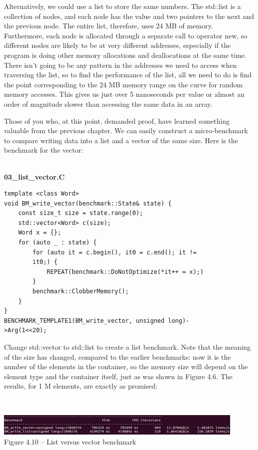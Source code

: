 Alternatively, we could use a list to store the same numbers. The std::list is a collection of nodes, and each node has the value and two pointers to the next and the previous node. The entire list, therefore, uses 24 MB of memory. Furthermore, each node is allocated through a separate call to operator new, so different nodes are likely to be at very different addresses, especially if the program is doing other memory allocations and deallocations at the same time. There isn't going to be any pattern in the addresses we need to access when traversing the list, so to find the performance of the list, all we need to do is find the point corresponding to the 24 MB memory range on the curve for random memory accesses. This gives us just over 5 nanoseconds per value or almost an order of magnitude slower than accessing the same data in an array.

Those of you who, at this point, demanded proof, have learned something valuable from the previous chapter. We can easily construct a micro-benchmark to compare writing data into a list and a vector of the same size. Here is the benchmark for the vector:

\hspace*{\fill} \\ %
\noindent
\textbf{03\_list\_vector.C}
\begin{lstlisting}[style=styleCXX]
template <class Word>
void BM_write_vector(benchmark::State& state) {
	const size_t size = state.range(0);
	std::vector<Word> c(size);
	Word x = {};
	for (auto _ : state) {
		for (auto it = c.begin(), it0 = c.end(); it !=
		it0;) {
			REPEAT(benchmark::DoNotOptimize(*it++ = x);)
		}
		benchmark::ClobberMemory();
	}
}
BENCHMARK_TEMPLATE1(BM_write_vector, unsigned long)-
>Arg(1<<20);
\end{lstlisting}

Change std::vector to std::list to create a list benchmark. Note that the meaning of the size has changed, compared to the earlier benchmarks: now it is the number of the elements in the container, so the memory size will depend on the element type and the container itself, just as was shown in Figure 4.6. The results, for 1 M elements, are exactly as promised:

\hspace*{\fill} \\ %
\begin{center}
\includegraphics[width=0.9\textwidth]{content/1/chapter4/images/10.jpg}\\
Figure 4.10 – List versus vector benchmark
\end{center}

